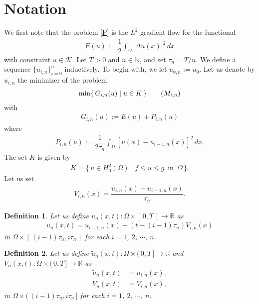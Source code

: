 \documentclass[12pt]{amsart}
\newtheorem{definition}{Definition}[section]
\begin{document}
\section{Notation} \label{setting}
We first note that the problem \eqref{P} is the $L^2$-gradient flow for the functional 
\begin{align}
E(u):= \dfrac{1}{2} \int_{\Omega} {\left| {\Delta u(x)} \right|}^2 \, dx 
\end{align}
with constraint $u \in {\mathcal{K}}$.  
Let $T>0$ and $n \in {\mathbb{N}}$, and set $\tau_n = T/n$. We define a sequence $\{ u_{i,n} \}^{n}_{i=0}$ inductively. 
To begin with, we let $u_{0,n} := u_0$. 
Let us denote by $u_{i,n}$ the minimizer of the problem 
\begin{align} \label{mini_in}
\min \{\, G_{i,n}(u) \mid u \in K \,\}  \tag{$M_{i,n}$}
\end{align}
with 
\begin{align} \label{G_in}
G_{i,n}(u):= E(u) + P_{i,n}(u)
\end{align}
where 
\begin{align}
P_{i,n}(u):= \dfrac{1}{2 \tau_n} \int_{\Omega} [ u(x) - u_{i-1,n}(x) ] ^2\, dx. 
\end{align}
The set $K$ is given by 
\begin{align}
K = \{\, u \in H^2_0(\Omega) \mid f \le u \le g \,\,\, \text{in} \,\,\, \Omega \,\}. 
\end{align}
Let us set 
\begin{align}
V_{i,n}(x)= \dfrac{u_{i,n}(x) - u_{i-1,n}(x)}{\tau_n}. 
\end{align}

\begin{definition} \label{piece-linear}
Let us define $u_n(x,t) : \Omega \times [\, 0,T \,] \to {\mathbb{R}}$ as 
\begin{align}
u_n(x,t)= u_{i-1,n}(x) + (t - (i-1) \tau_n) V_{i,n}(x) 
\end{align}
in $\Omega \times [\, (i-1) \tau_n, i \tau_n \,]$ for each $i=1$, $2$, $\cdots$, $n$. 
\end{definition}

\begin{definition} \label{piece-constant}
Let us define $\tilde{u}_n(x,t) : \Omega \times (\, 0,T \,] \to {\mathbb{R}}$ and $V_n(x,t) : \Omega \times (\, 0,T \,] \to {\mathbb{R}}$ as 
\begin{align}
\tilde{u}_n(x,t)&= u_{i,n}(x), \\
V_n(x,t)&= V_{i,n}(x), 
\end{align}
in $\Omega \times (\, (i-1) \tau_n, i \tau_n \,]$ for each $i=1$, $2$, $\cdots$, $n$. 
\end{definition}
\end{document}
